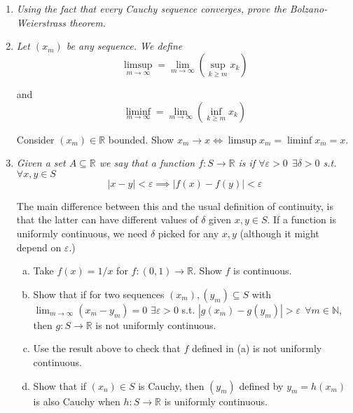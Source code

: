 \documentclass{article}
\begin{document}
\displayoptions

\section{}

\begin{enumerate}[1.]
  \item \textit{Using the fact that every Cauchy sequence converges, prove the Bolzano-Weierstrass theorem.}

  \item {\itshape
    Let $(x_m)$ be any sequence. We define
    \[
      \limsup_{m \to \infty} = \lim_{m \to \infty} \left(\sup_{k \ge m} x_k\right)
    \]

    and
    \[
      \liminf_{m \to \infty} = \lim_{m \to \infty} \left(\inf_{k \ge m} x_k\right)
    \]

    Consider $(x_m) \in \mathbb{R}$ bounded. Show $x_m \to x \iff \limsup x_m = \liminf x_m = x$.}

  \item {\itshape
    Given a set $A \subseteq \mathbb{R}$ we say that a function $f: S \to \mathbb{R}$ is  if $\forall \varepsilon > 0 ~~ \exists \delta > 0$ s.t. $\forall x, y \in S$
    \[
      |x - y| < \varepsilon \implies |f(x) - f(y)| < \varepsilon
    \]

    The main difference between this and the usual definition of continuity, is that the latter can have different values of $\delta$ given $x, y \in S$. If a function is uniformly continuous, we need $\delta$ picked for any $x, y$ (although it might depend on $\varepsilon$.)
    \begin{enumerate}[a)]
      \item Take $f(x) = 1 / x$ for $f: (0, 1) \to \mathbb{R}$. Show $f$ is continuous.

      \item Show that if for two sequences $(x_m), (y_m) \subseteq S$ with $\lim_{m \to \infty} (x_m - y_m) = 0$ $\exists \varepsilon > 0$ s.t. $|g(x_m) - g(y_m)| > \varepsilon ~~ \forall m \in \mathbb{N}$, then $g: S \to \mathbb{R}$ is not uniformly continuous.

      \item Use the result above to check that $f$ defined in (a) is not uniformly continuous.

      \item Show that if $(x_n) \in S$ is Cauchy, then $(y_m)$ defined by $y_m = h(x_m)$ is also Cauchy when $h: S \to \mathbb{R}$ is uniformly continuous.


\end{enumerate}}
\end{enumerate}
\end{document}
